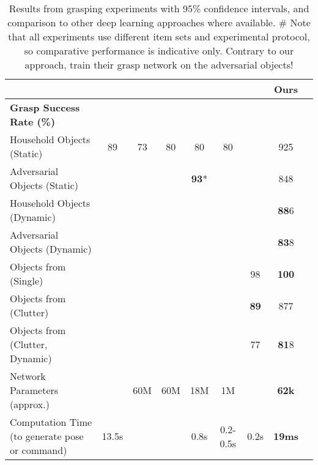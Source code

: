 \documentclass[conference]{IEEEtran}
\begin{document}
\begin{table*}[t!]
    \begin{center}
        \vspace{-3mm}
        \begin{tabular}{@{}lcccccccc@{}}
        \toprule
        & \cite{Lenz2015DeepGrasps} & \cite{Pinto2016SupersizingHours} & \cite{Johns2016DeepUncertainty} & \cite{Mahler2017Dex2} & \cite{Levine2017LearningCollection} & \cite{Viereck2017LearningImages} & \textbf{Ours} \\
        \midrule
        
        \textbf{Grasp Success Rate (\%)} \\                                    
        Household Objects (Static)   & 89    & 73    & 80   & 80   & 80  &      & 925  \\
        Adversarial Objects (Static)      &       &       &      & \textbf{93}*& &   & 848 \\
        Household Objects (Dynamic)       &       &       &      &      &     &      & \textbf{88}6 \\
        Adversarial Objects (Dynamic)     &       &       &      &      &     &      & \textbf{83}8 \\
        Objects from~\cite{Viereck2017LearningImages} (Single)
                                          &       &       &      &      &     & 98   & \textbf{100} \\
        Objects from~\cite{Viereck2017LearningImages} (Clutter)
                                          &       &       &      &      &     & \textbf{89} & 877 \\
        Objects from~\cite{Viereck2017LearningImages} (Clutter, Dynamic)
                                          &       &       &      &      &     & 77   & \textbf{81}8 \\
                                             
        \midrule
        Network Parameters (approx.)      &       & 60M   & 60M  & 18M  & 1M  &      & \textbf{62k} \\
        Computation Time (to generate pose or command) & 13.5s &       &      & 0.8s & 0.2-0.5s & 0.2s & \textbf{19ms} \\
        \bottomrule
        \end{tabular}
    
        \vspace{2mm}
        \caption{Results from grasping experiments with 95\% confidence intervals, and comparison to other deep learning approaches where available. \newline \# Note that all experiments use different item sets and experimental protocol, so comparative performance is indicative only. \newline *Contrary to our approach, \cite{Mahler2017Dex2} train their grasp network on the adversarial objects! }
        \label{tab:results}
        \vspace{-8mm}
    \end{center}
    
\end{table*}
\end{document}
